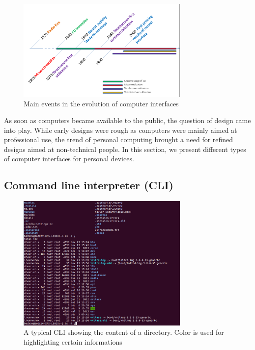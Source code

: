 \documentclass[a4paper,11pt] {article}
\theoremstyle{definition}
\begin{document}
    \begin{figure}[h]
        \centering
        \includegraphics[width=0.75\textwidth]{fig-report/timeline-interface.png}
        \caption{Main events in the evolution of computer interfaces}
        \label{fig:timeline}
    \end{figure}

    As soon as computers became available to the public, the question of design came into play. While early designs were rough as computers were mainly aimed at professional use, the trend of personal computing brought a need for refined designs aimed at non-technical people. In this section, we present different types of computer interfaces for personal devices.

    \subsection{Command line interpreter (CLI)}

    \begin{figure}[h]
        \centering
        \includegraphics[width=0.75\textwidth]{fig-report/terminal.png}
        \caption{A typical CLI showing the content of a directory. Color is used for highlighting certain informations}
        \label{fig:cli}
    \end{figure}
\end{document}
